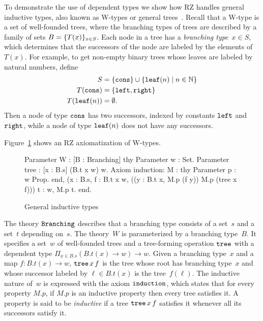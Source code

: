 To demonstrate the use of dependent types we show how RZ handles
general inductive types, also known as W-types or general
trees~\cite{nordstroem90:_progr_martin_type_theor}. Recall that a
W-type is a set of well-founded trees, where the branching types of
trees are described by a family of sets $B = \{T(x)\}_{x \in S}$.
Each node in a tree has a \emph{branching type}~$x \in S$, which
determines that the successors of the node are labeled by the elements
of~$T(x)$.
%
\iflong
%
For example, to get non-empty binary trees whose leaves are
labeled by natural numbers, define
%
\begin{align*}
  S &= \{\mathtt{cons}\} \cup \{\mathtt{leaf}(n) \mid n \in \mathbb{N}\}
  \\
  T(\mathtt{cons}) &= \{\mathtt{left}, \mathtt{right}\}
  \\
  T(\mathtt{leaf}(n)) &= \emptyset.
\end{align*}
%
Then a node of type $\mathtt{cons}$ has two successors, indexed by
constants $\mathtt{left}$ and $\mathtt{right}$, while a node of type
$\mathtt{leaf}(n)$ does not have any successors.
\par
%
\fi %
%
Figure~\ref{fig:wtype} shows an RZ axiomatization of W-types.
%
\begin{figure}
\begin{source}
Parameter W : [B : Branching] \iTo
thy
  Parameter w : Set.
  Parameter tree : [x : B.s] \iTo (B.t x \iTo w) \iTo w.
  Axiom induction:
    \iForall M : thy Parameter p : w \iTo Prop. end,
    (\iForall x : B.s, \iForall f : B.t x \iTo w,
       ((\iForall y : B.t x, M.p (f y)) \iTo M.p (tree x f))) \iTo
    \iForall t : w, M.p t.
end.
\end{source}
  \caption{General inductive types}
  \label{fig:wtype}
\end{figure}
%
The theory $\mathtt{Branching}$ describes that a branching type
consists of a set~$s$ and a set~$t$ depending on~$s$. The theory~$W$ is
parameterized by a branching type~$B$. It specifies a set~$w$ of
well-founded trees and a tree-forming operation $\mathtt{tree}$ with a
dependent type $\Pi_{x \in B.s} (B.t(x) \to w) \to w$.
%
\iflong
%
Given a
branching type~$x$ and a map $f : B.t(x) \to w$, $\mathtt{tree}\,x\,f$
is the tree whose root has branching type~$x$ and whose successor
labeled by $\ell \in B.t(x)$ is the tree~$f(\ell)$.
%
\fi
%
The inductive nature of~$w$ is expressed with the axiom
$\mathtt{induction}$, which states that for every property $M.p$, if $M.p$
is an inductive property then every tree satisfies it. A property is
said to be \emph{inductive} if a tree $\mathtt{tree}\,x\,f$ satisfies it
whenever all its successors satisfy it.

